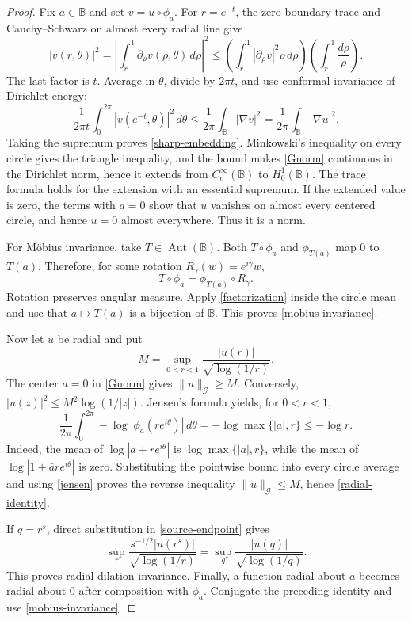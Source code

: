 \documentclass[11pt]{article}
\newcommand{\B}{\mathbb B}
\newcommand{\G}{\mathcal G}
\newcommand{\Aut}{\operatorname{Aut}}
\begin{document}
\begin{proof}
Fix $a\in\B$ and set $v=u\circ\phi_a$.  For $r=e^{-t}$, the zero
boundary trace and Cauchy--Schwarz on almost every radial line give
\[
 |v(r,\theta)|^2
 =\left|\int_r^1\partial_\rho v(\rho,\theta)\,d\rho\right|^2
 \le
 \left(\int_r^1|\partial_\rho v|^2\rho\,d\rho\right)
 \left(\int_r^1\frac{d\rho}{\rho}\right).
\]
The last factor is $t$.  Average in $\theta$, divide by $2\pi t$,
and use conformal invariance of Dirichlet energy:
\[
 \frac1{2\pi t}\int_0^{2\pi}|v(e^{-t},\theta)|^2\,d\theta
 \le \frac1{2\pi}\int_{\B}|\nabla v|^2
 =\frac1{2\pi}\int_{\B}|\nabla u|^2.
\]
Taking the supremum proves \eqref{sharp-embedding}.  Minkowski's
inequality on every circle gives the triangle inequality, and the bound
makes \eqref{Gnorm} continuous in the Dirichlet norm, hence it extends
from $C_c^\infty(\B)$ to $H_0^1(\B)$.  The trace formula holds for the
extension with an essential supremum.  If the extended value is zero,
the terms with $a=0$ show that $u$ vanishes on almost every centered
circle, and hence $u=0$ almost everywhere.  Thus it is a norm.

For M\"obius invariance, take $T\in\Aut(\B)$.  Both
$T\circ\phi_a$ and $\phi_{T(a)}$ map $0$ to $T(a)$.  Therefore, for
some rotation $R_\gamma(w)=e^{i\gamma}w$,
\begin{equation}\label{factorization}
 T\circ\phi_a=\phi_{T(a)}\circ R_\gamma.
\end{equation}
Rotation preserves angular measure.  Apply \eqref{factorization} inside
the circle mean and use that $a\mapsto T(a)$ is a bijection of $\B$.
This proves \eqref{mobius-invariance}.

Now let $u$ be radial and put
\[
 M=\sup_{0<r<1}\frac{|u(r)|}{\sqrt{\log(1/r)}}.
\]
The center $a=0$ in \eqref{Gnorm} gives $\|u\|_{\G}\ge M$.  Conversely,
$|u(z)|^2\le M^2\log(1/|z|)$.  Jensen's formula yields, for
$0<r<1$,
\begin{equation}\label{jensen}
 \frac1{2\pi}\int_0^{2\pi}
 -\log|\phi_a(re^{i\theta})|\,d\theta
 =
 -\log\max\{|a|,r\}
 \le -\log r.
\end{equation}
Indeed, the mean of $\log|a+re^{i\theta}|$ is
$\log\max\{|a|,r\}$, while the mean of
$\log|1+\bar a r e^{i\theta}|$ is zero.  Substituting the pointwise
bound into every circle average and using \eqref{jensen} proves the
reverse inequality $\|u\|_{\G}\le M$, hence \eqref{radial-identity}.

If $q=r^s$, direct substitution in \eqref{source-endpoint} gives
\[
 \sup_r\frac{s^{-1/2}|u(r^s)|}{\sqrt{\log(1/r)}}
 =
 \sup_q\frac{|u(q)|}{\sqrt{\log(1/q)}}.
\]
This proves radial dilation invariance.  Finally, a function radial
about $a$ becomes radial about $0$ after composition with $\phi_a$.
Conjugate the preceding identity and use \eqref{mobius-invariance}.


\end{proof}
\end{document}
